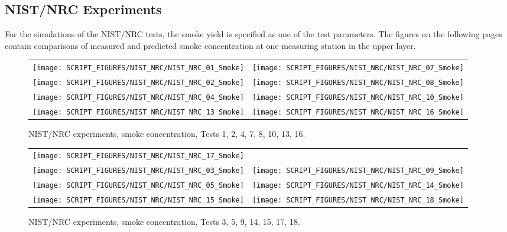 \clearpage

\subsection{NIST/NRC Experiments}
\label{Smoke Concentration}

For the simulations of the NIST/NRC tests, the smoke yield is specified as one of the test parameters.
The figures on the following pages contain comparisons of measured and predicted smoke concentration at one measuring station in the upper layer.

\newpage

\begin{figure}[p]
\begin{tabular*}{\textwidth}{l@{\extracolsep{\fill}}r}
\texttt{[image: SCRIPT\_FIGURES/NIST\_NRC/NIST\_NRC\_01\_Smoke]} &
\texttt{[image: SCRIPT\_FIGURES/NIST\_NRC/NIST\_NRC\_07\_Smoke]} \\
\texttt{[image: SCRIPT\_FIGURES/NIST\_NRC/NIST\_NRC\_02\_Smoke]} &
\texttt{[image: SCRIPT\_FIGURES/NIST\_NRC/NIST\_NRC\_08\_Smoke]} \\
\texttt{[image: SCRIPT\_FIGURES/NIST\_NRC/NIST\_NRC\_04\_Smoke]} &
\texttt{[image: SCRIPT\_FIGURES/NIST\_NRC/NIST\_NRC\_10\_Smoke]} \\
\texttt{[image: SCRIPT\_FIGURES/NIST\_NRC/NIST\_NRC\_13\_Smoke]} &
\texttt{[image: SCRIPT\_FIGURES/NIST\_NRC/NIST\_NRC\_16\_Smoke]}
\end{tabular*}
\caption{NIST/NRC experiments, smoke concentration, Tests 1, 2, 4, 7, 8, 10, 13, 16.}
\end{figure}

\begin{figure}[p]
\begin{tabular*}{\textwidth}{l@{\extracolsep{\fill}}r}
\texttt{[image: SCRIPT\_FIGURES/NIST\_NRC/NIST\_NRC\_17\_Smoke]} &
 \\
\texttt{[image: SCRIPT\_FIGURES/NIST\_NRC/NIST\_NRC\_03\_Smoke]} &
\texttt{[image: SCRIPT\_FIGURES/NIST\_NRC/NIST\_NRC\_09\_Smoke]} \\
\texttt{[image: SCRIPT\_FIGURES/NIST\_NRC/NIST\_NRC\_05\_Smoke]} &
\texttt{[image: SCRIPT\_FIGURES/NIST\_NRC/NIST\_NRC\_14\_Smoke]} \\
\texttt{[image: SCRIPT\_FIGURES/NIST\_NRC/NIST\_NRC\_15\_Smoke]} &
\texttt{[image: SCRIPT\_FIGURES/NIST\_NRC/NIST\_NRC\_18\_Smoke]}
\end{tabular*}
\caption{NIST/NRC experiments, smoke concentration, Tests 3, 5, 9, 14, 15, 17, 18.}
\end{figure}


